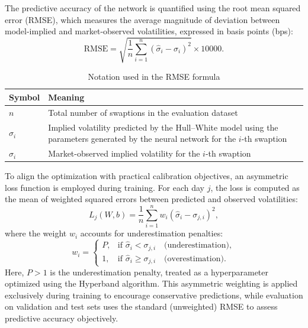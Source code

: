 {The predictive accuracy of the network is quantified using the root mean squared error (RMSE), which measures the average magnitude of deviation between model-implied and market-observed volatilities, expressed in basis points (bps):
\begin{equation}
	\text{RMSE} = \sqrt{\frac{1}{n}\sum_{i=1}^{n}(\hat{\sigma}_i - \sigma_i)^2} \times 10000.
\end{equation}

\begin{table}[H]
	\centering
	\caption{Notation used in the RMSE formula}
	\begin{tabular}{lp{12cm}}
		\toprule
		Symbol  & Meaning                                                                                                                   \\
		\midrule
		$n$              & Total number of swaptions in the evaluation dataset                                                                                \\
		$\hat{\sigma}_i$ & Implied volatility predicted by the Hull--White model using the parameters generated by the neural network for the $i$-th swaption \\
		$\sigma_i$       & Market-observed implied volatility for the $i$-th swaption                                                                         \\
		\bottomrule
	\end{tabular}
\end{table}

To align the optimization with practical calibration objectives, an asymmetric loss function is employed during training. For each day $j$, the loss is computed as the mean of weighted squared errors between predicted and observed volatilities:
\begin{equation}
	L_j(W, b) = \frac{1}{n} \sum_{i=1}^{n} w_i (\hat{\sigma}_i - \sigma_{j,i})^2,
\end{equation}
where the weight $w_i$ accounts for underestimation penalties:
\begin{equation}
	w_i =
	\begin{cases}
		P, & \text{if } \hat{\sigma}_i < \sigma_{j,i} \quad \text{(underestimation)},   \\
		1, & \text{if } \hat{\sigma}_i \geq \sigma_{j,i} \quad \text{(overestimation)}.
	\end{cases}
\end{equation}
Here, $P>1$ is the underestimation penalty, treated as a hyperparameter optimized using the Hyperband algorithm. This asymmetric weighting is applied exclusively during training to encourage conservative predictions, while evaluation on validation and test sets uses the standard (unweighted) RMSE to assess predictive accuracy objectively.

}
